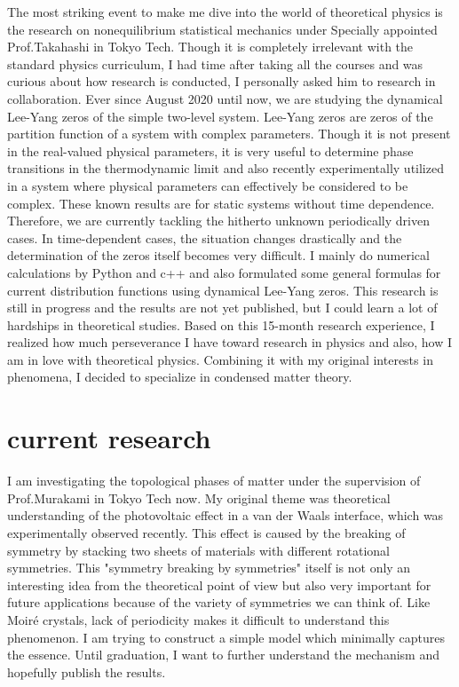 \documentclass[a4]{article}
\begin{document}
The most striking event to make me dive into the world of theoretical physics is the research on nonequilibrium statistical mechanics under Specially appointed Prof.Takahashi in Tokyo Tech. Though it is completely irrelevant with the standard physics curriculum, I had time after taking all the courses and was curious about how research is conducted, I personally asked him to research in collaboration. Ever since August 2020 until now, we are studying the dynamical Lee-Yang zeros of the simple two-level system. Lee-Yang zeros are zeros of the partition function of a system with complex parameters. Though it is not present in the real-valued physical parameters, it is very useful to determine phase transitions in the thermodynamic limit and also recently experimentally utilized in a system where physical parameters can effectively be considered to be complex. These known results are for static systems without time dependence. Therefore, we are currently tackling the hitherto unknown periodically driven cases. In time-dependent cases, the situation changes drastically and the determination of the zeros itself becomes very difficult. I mainly do numerical calculations by Python and c++ and also formulated some general formulas for current distribution functions using dynamical Lee-Yang zeros. This research is still in progress and the results are not yet published, but I could learn a lot of hardships in theoretical studies. Based on this 15-month research experience, I realized how much  perseverance I have toward research in physics and also, how I am in love with theoretical physics. Combining it with my original interests in phenomena, I decided to specialize in condensed matter theory.\par

\section{current research}
I am investigating the topological phases of matter under the supervision of Prof.Murakami in Tokyo Tech now. My original theme was theoretical understanding of the photovoltaic effect in a van der Waals interface, which was experimentally observed recently. This effect is caused by the breaking of symmetry by stacking two sheets of materials with different rotational symmetries. This "symmetry breaking by symmetries" itself is not only an interesting idea from the theoretical point of view but also very important for future applications because of the variety of symmetries we can think of.  Like Moir\'{e} crystals, lack of periodicity makes it difficult to understand this phenomenon. I am trying to construct a simple model which minimally captures the essence. Until graduation, I want to further understand the mechanism and hopefully publish the results. \par
\end{document}
